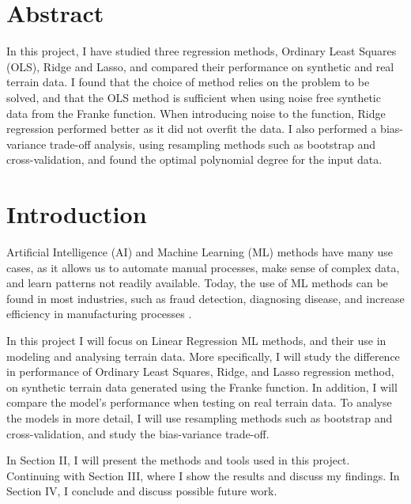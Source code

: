 \section{Abstract}\label{sec:ex1}
In this project, I have studied three regression methods, Ordinary Least Squares (OLS), Ridge and Lasso, and compared their performance on synthetic and real terrain data. I found that the choice of method relies on the problem to be solved, and that the OLS method is sufficient when using noise free synthetic data from the Franke function. When introducing noise to the function, Ridge regression performed better as it did not overfit the data. I also performed a bias-variance trade-off analysis, using resampling methods such as bootstrap and cross-validation, and found the optimal polynomial degree for the input data.

\section{Introduction}\label{sec:ex2}
Artificial Intelligence (AI) and Machine Learning (ML) methods have many use cases, as it allows us to automate manual processes, make sense of complex data, and learn patterns not readily available. Today, the use of ML methods can be found in most industries, such as fraud detection, diagnosing disease, and increase efficiency in manufacturing processes \cite{forbes:2023:machine_learning}. 

In this project I will focus on Linear Regression ML methods, and their use in modeling and analysing terrain data. More specifically, I will study the difference in performance of Ordinary Least Squares, Ridge, and Lasso regression method, on synthetic terrain data generated using the Franke function. In addition, I will compare the model's performance when testing on real terrain data. To analyse the models in more detail, I will use resampling methods such as bootstrap and cross-validation, and study the bias-variance trade-off.

In Section II, I will present the methods and tools used in this project. Continuing with Section III, where I show the results and discuss my findings. In Section IV, I conclude and discuss possible future work.


